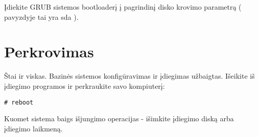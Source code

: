   Įdiekite GRUB sistemos bootloaderį į pagrindinį disko krovimo
  parametrą ( pavyzdyje tai yra sda ).

\section{Perkrovimas}

  Štai ir viskas. Bazinės sistemos konfigūravimas ir įdiegimas
  užbaigtas. Išeikite iš įdiegimo programos ir perkraukite savo
  kompiuterį:

  \begin{verbatim}
# reboot
  \end{verbatim}

  Kuomet sistema baigs išjungimo operacijas - išimkite įdiegimo diską
  arba įdiegimo laikmeną.
